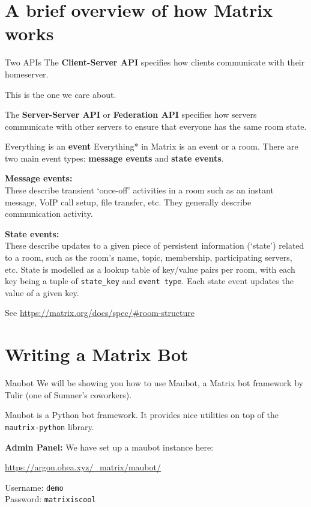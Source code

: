 \documentclass{acm}
\begin{document}
\section{A brief overview of how Matrix works}

\begin{frame}{Two APIs}
    The \textbf{Client-Server API} specifies how clients communicate with their
    homeserver.

    This is the one we care about. \pause

    The \textbf{Server-Server API} or \textbf{Federation API} specifies how
    servers communicate with other servers to ensure that everyone has the same
    room state.
\end{frame}

\begin{frame}{Everything is an \textbf{event}}
    Everything* in Matrix is an event or a room. There are two main event types:
    \textbf{message events} and \textbf{state events}.
    \pause

    \textbf{Message events:} \\
    These describe transient `once-off' activities in a room such as an instant
    message, VoIP call setup, file transfer, etc. They generally describe
    communication activity.
    \pause

    \textbf{State events:} \\
    These describe updates to a given piece of persistent information (`state')
    related to a room, such as the room's name, topic, membership, participating
    servers, etc. State is modelled as a lookup table of key/value pairs per
    room, with each key being a tuple of \texttt{state\_key} and \texttt{event
    type}. Each state event updates the value of a given key.

    {
        \tiny
        See \url{https://matrix.org/docs/spec/\#room-structure}
    }
\end{frame}

\section{Writing a Matrix Bot}

\begin{frame}{Maubot}
    We will be showing you how to use Maubot, a Matrix bot framework by Tulir
    (one of Sumner's coworkers).

    Maubot is a Python bot framework. It provides nice utilities on top of the
    \texttt{mautrix-python} library. \pause

    \textbf{Admin Panel:} We have set up a maubot instance here:

    \begin{center}
        \Large
        \url{https://argon.ohea.xyz/_matrix/maubot/}
    \end{center}

    Username: \texttt{demo} \\
    Password: \texttt{matrixiscool}
\end{frame}
\end{document}
